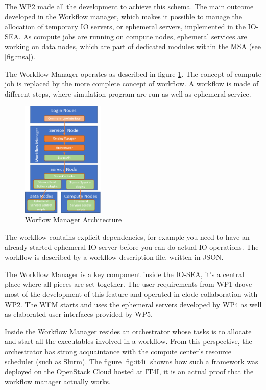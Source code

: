 The WP2 made all the development to achieve this schema. The main outcome developed in the Workflow manager,
which makes it possible to manage the allocation of temporary IO servers, or ephemeral servers, implemented in 
the IO-SEA. As compute jobs are running on compute nodes, ephemeral services are working on data nodes, which
are part of dedicated modules within the MSA (see \ref{fig:msa}). 

The Workflow Manager operates as described in figure \ref{fig:wfm}. The concept of compute job is replaced by
the more complete concept of workflow. A workflow is made of different steps, where simulation program are run
as well as ephemeral service. 

\begin{figure}[H]
    \centering
    \includegraphics[width=0.35\textwidth]{FIGS/wfm.png}
    \caption[Worflow Manager Architecture]{ Worflow Manager Architecture}
    \label{fig:wfm}
\end{figure}

The workflow contains explicit dependencies, for example you need to have an
already started ephemeral IO server before you can do actual IO operations. The workflow is described by a 
workflow description file, written in JSON. 

The Workflow Manager is a key component inside the IO-SEA, it's a central place where all pieces are set
together. The user requirements from WP1 drove most of the development of this feature and operated in clode
collaboration with WP2. The WFM starts and uses the ephemeral servers developed by WP4 as well as elaborated
user interfaces provided by WP5. 

Inside the Workflow Manager resides an orchestrator whose tasks is to allocate and start all the executables
involved in a workflow. From this perspective, the orchestrator has strong acquaintance with the compute center's
resource scheduler (such as Slurm). The figure \ref{fig:it4i} showns how such a framework was deployed on the 
OpenStack Cloud hosted at IT4I, it is an actual proof that the workflow manager actually works. 

